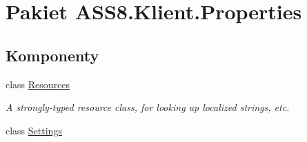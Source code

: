 \hypertarget{a00061}{
\section{Pakiet ASS8.Klient.Properties}
\label{d4/de8/a00061}
}
\subsection*{Komponenty}
\begin{CompactItemize}
\item 
class \hyperlink{a00022}{Resources}
\begin{CompactList}\small\item\em A strongly-typed resource class, for looking up localized strings, etc. \item\end{CompactList}\item 
class \hyperlink{a00027}{Settings}
\end{CompactItemize}
